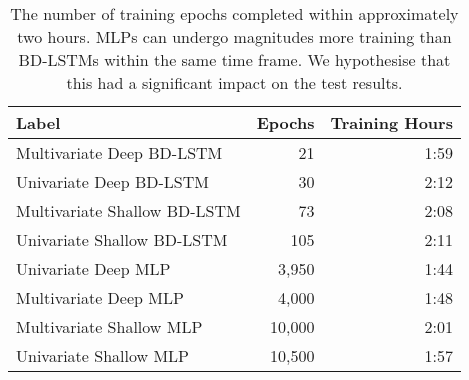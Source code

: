 \begin{table}[H]
\centering
\begin{tabular}{lrr}
\toprule
Label & Epochs & Training Hours \\
\midrule
Multivariate Deep BD-LSTM & 21 & 1:59 \\
Univariate Deep BD-LSTM & 30 & 2:12 \\
Multivariate Shallow BD-LSTM & 73 & 2:08 \\
Univariate Shallow BD-LSTM & 105 & 2:11 \\
Univariate Deep MLP & 3,950 & 1:44 \\
Multivariate Deep MLP & 4,000 & 1:48 \\
Multivariate Shallow MLP & 10,000 & 2:01 \\
Univariate Shallow MLP & 10,500 & 1:57 \\
\bottomrule
\end{tabular}
\caption{The number of training epochs completed within approximately two hours. MLPs can undergo magnitudes more training than BD-LSTMs within the same time frame. We hypothesise that this had a significant impact on the test results.}
\label{ttimes}
\end{table}
